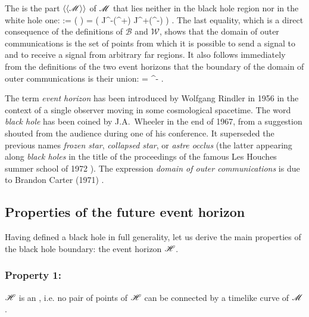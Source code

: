 The 
is the part $\langle\langle \mathscr{M}\rangle\rangle$ of $\mathscr{M}$ that lies neither
in the black hole region nor in the white hole one:
\be
    \langle\langle \M\rangle\rangle := \M\setminus (\cup {} )
            = \left( J^-(\scri^+) \cap J^+(\scri^-) \right) \cap \M .
\ee
The last equality, which is a direct consequence of the definitions of
$\mathscr{B}$ and $\mathscr{W}$, shows that the domain of outer communications
is the set of points from which it is possible to send a signal to and to
receive a signal from arbitrary far regions.
It also follows immediately from the definitions of the two event horizons
that the boundary of the domain of outer communications is their union:
\be
    \partial \langle\langle \M\rangle\rangle  = \Hor \cup \Hor^- .
\ee

\begin{hist}
The term \emph{event horizon} has been introduced by Wolfgang Rindler in 1956 \cite{Rindl56}
in the context of a single observer moving in some cosmological spacetime.
The word \emph{black hole} has been coined by J.A.~Wheeler in the end of 1967,
from a suggestion shouted from the audience during one of his conference.
It superseded the previous names
\emph{frozen star}, \emph{collapsed star}, or \emph{astre occlus}
(the latter appearing along \emph{black holes} in the title of
the proceedings of the famous Les Houches summer school of 1972 \cite{DeWit73}).
The expression \emph{domain of outer communications} is due to
Brandon Carter
(1971) \cite{Carte71}.
\end{hist}


\subsection{Properties of the future event horizon} \label{s:glo:properties_H}

Having defined a black hole in full generality, let us derive the
main properties of the black hole boundary: the event horizon $\mathscr{H}$.

\subsubsection{Property 1:}
\begin{greybox}
$\mathscr{H}$ is an , i.e. no pair of points of $\mathscr{H}$ can be connected
by a timelike curve of $\mathscr{M}$.
\end{greybox}


